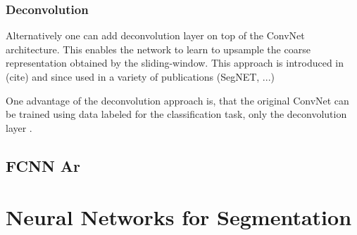 \subsubsection{Deconvolution} Alternatively one can add deconvolution layer on top of the ConvNet architecture. This enables the network to learn to upsample the coarse representation obtained by the sliding-window. This approach is introduced in (cite) and since used in a variety of publications (SegNET, ...)

One advantage of the deconvolution approach is, that the original ConvNet can be trained using data labeled for the classification task, only the deconvolution layer .

\subsection{FCNN Ar}


\section{Neural Networks for Segmentation}




\clearpage